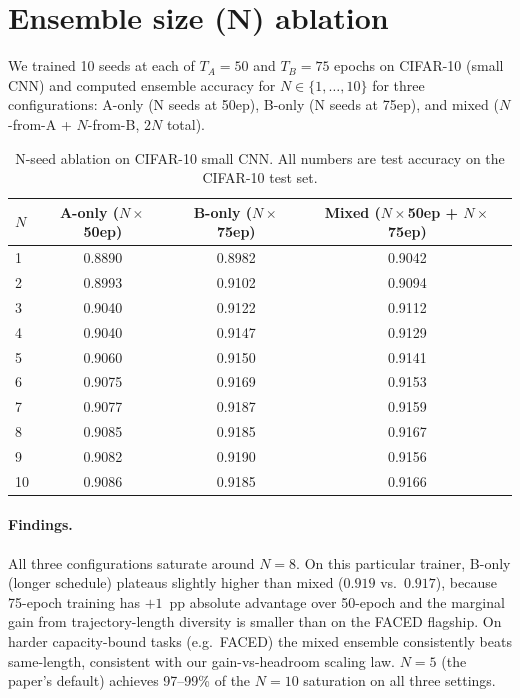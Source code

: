 \section{Ensemble size (N) ablation}
\label{sup:nablation}

We trained 10 seeds at each of $T_A=50$ and $T_B=75$ epochs on CIFAR-10
(small CNN) and computed ensemble accuracy for $N \in \{1, \ldots, 10\}$
for three configurations: A-only (N seeds at 50ep), B-only (N seeds at
75ep), and mixed ($N$-from-A + $N$-from-B, $2N$ total).

\begin{table}[h]
\centering
\caption{N-seed ablation on CIFAR-10 small CNN. All numbers are test
accuracy on the CIFAR-10 test set.}
\label{tab:sup_nablation}
\begin{tabular}{lccc}
\toprule
$N$ & A-only ($N\times$50ep) & B-only ($N\times$75ep) & Mixed ($N\times$50ep + $N\times$75ep) \\
\midrule
1  & 0.8890 & 0.8982 & 0.9042 \\
2  & 0.8993 & 0.9102 & 0.9094 \\
3  & 0.9040 & 0.9122 & 0.9112 \\
4  & 0.9040 & 0.9147 & 0.9129 \\
5  & 0.9060 & 0.9150 & 0.9141 \\
6  & 0.9075 & 0.9169 & 0.9153 \\
7  & 0.9077 & 0.9187 & 0.9159 \\
8  & 0.9085 & 0.9185 & 0.9167 \\
9  & 0.9082 & 0.9190 & 0.9156 \\
10 & 0.9086 & 0.9185 & 0.9166 \\
\bottomrule
\end{tabular}
\end{table}

\paragraph{Findings.}
All three configurations saturate around $N=8$. On this particular
trainer, B-only (longer schedule) plateaus slightly higher than mixed
($0.919$ vs.\ $0.917$), because 75-epoch training has $+1$~pp absolute
advantage over 50-epoch and the marginal gain from trajectory-length
diversity is smaller than on the FACED flagship. On harder
capacity-bound tasks (e.g.\ FACED) the mixed ensemble consistently beats
same-length, consistent with our gain-vs-headroom scaling law.
$N=5$ (the paper's default) achieves 97--99\% of the $N=10$ saturation
on all three settings.

